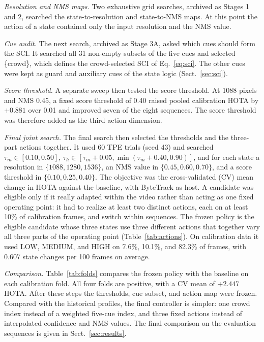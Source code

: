 \documentclass[pdflatex,sn-mathphys-num,iicol]{sn-jnl}
\begin{document}
\emph{Resolution and NMS maps.} Two exhaustive grid searches, archived as
Stages 1 and 2, searched the state-to-resolution and state-to-NMS maps. At
this point the action of a state contained only the input resolution and the
NMS value.

\emph{Cue audit.} The next search, archived as Stage 3A, asked which cues
should form the SCI. It searched
all 31 non-empty subsets of the five cues and selected \{crowd\}, which defines
the crowd-selected SCI of Eq.~\eqref{eq:sci}. The other cues were kept as guard
and auxiliary cues of the state logic (Sect.~\ref{sec:sci}).

\emph{Score threshold.} A separate sweep then tested the score threshold. At
1088 pixels and NMS 0.45, a fixed score threshold of 0.40 raised pooled
calibration HOTA by $+0.881$ over 0.01 and improved seven of the eight
sequences. The score threshold was therefore added as the third action
dimension.

\emph{Final joint search.} The final search then selected the thresholds and
the three-part actions together. It used 60 TPE trials (seed 43) and searched
$\tau_m\in[0.10,0.50]$, $\tau_h\in[\tau_m+0.05,\min(\tau_m+0.40,0.90)]$,
and for each state a resolution in $\{1088,1280,1536\}$, an NMS value in
$\{0.45,0.60,0.70\}$, and a score threshold in $\{0.10,0.25,0.40\}$. The
objective was the cross-validated (CV) mean change in HOTA against the
baseline, with ByteTrack as host. A candidate was eligible only if it really adapted within the video
rather than acting as one fixed operating point: it had to realize at least
two distinct actions, each on at least 10\% of calibration frames, and switch
within sequences. The frozen policy is the eligible candidate whose three
states use three different actions that together vary all three parts of the
operating point (Table~\ref{tab:actions}). On calibration data it used LOW,
MEDIUM, and HIGH on 7.6\%, 10.1\%, and 82.3\% of frames, with 0.607 state
changes per 100 frames on average.

\emph{Comparison.} Table~\ref{tab:folds} compares the frozen policy with the
baseline on each calibration fold. All four folds are positive, with a CV
mean of $+2.447$ HOTA. After these steps the thresholds, cue subset, and
action map were frozen. Compared with the historical profiles, the final
controller is simpler: one crowd index instead of a weighted five-cue index,
and three fixed actions instead of interpolated confidence and NMS values. The final
comparison on the evaluation sequences is given in Sect.~\ref{sec:results}.
\end{document}
